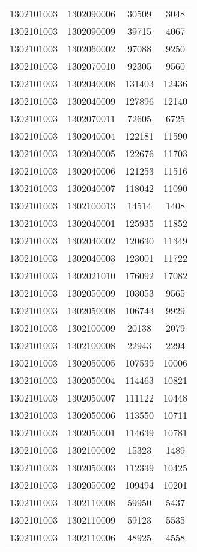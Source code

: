 \begin{longtable}[h]{llcc}
		1302101003 & 1302090006 & 30509 & 3048\\
		1302101003 & 1302090009 & 39715 & 4067\\
		1302101003 & 1302060002 & 97088 & 9250\\
		1302101003 & 1302070010 & 92305 & 9560\\
		1302101003 & 1302040008 & 131403 & 12436\\
		1302101003 & 1302040009 & 127896 & 12140\\
		1302101003 & 1302070011 & 72605 & 6725\\
		1302101003 & 1302040004 & 122181 & 11590\\
		1302101003 & 1302040005 & 122676 & 11703\\
		1302101003 & 1302040006 & 121253 & 11516\\
		1302101003 & 1302040007 & 118042 & 11090\\
		1302101003 & 1302100013 & 14514 & 1408\\
		1302101003 & 1302040001 & 125935 & 11852\\
		1302101003 & 1302040002 & 120630 & 11349\\
		1302101003 & 1302040003 & 123001 & 11722\\
		1302101003 & 1302021010 & 176092 & 17082\\
		1302101003 & 1302050009 & 103053 & 9565\\
		1302101003 & 1302050008 & 106743 & 9929\\
		1302101003 & 1302100009 & 20138 & 2079\\
		1302101003 & 1302100008 & 22943 & 2294\\
		1302101003 & 1302050005 & 107539 & 10006\\
		1302101003 & 1302050004 & 114463 & 10821\\
		1302101003 & 1302050007 & 111122 & 10448\\
		1302101003 & 1302050006 & 113550 & 10711\\
		1302101003 & 1302050001 & 114639 & 10781\\
		1302101003 & 1302100002 & 15323 & 1489\\
		1302101003 & 1302050003 & 112339 & 10425\\
		1302101003 & 1302050002 & 109494 & 10201\\
		1302101003 & 1302110008 & 59950 & 5437\\
		1302101003 & 1302110009 & 59123 & 5535\\
		1302101003 & 1302110006 & 48925 & 4558\\

\end{longtable}
